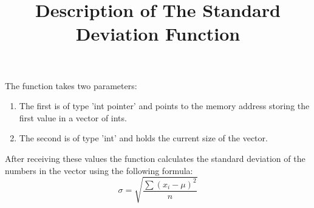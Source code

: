 \documentclass[11pt, letterpaper]{report}
\begin{document}
\title{Description of The Standard Deviation Function}
\maketitle
\noindent The function takes two parameters:
\begin{enumerate}
    \item The first is of type 'int pointer' and points to the memory address storing the first value in a vector of ints.
    \item The second is of type 'int' and holds the current size of the vector.
\end{enumerate}
After receiving these values the function calculates the standard deviation of the numbers in the vector using the following formula:\\
\begin{equation*}
    \sigma = \sqrt{\frac{\sum (x_i - \mu)^2}{n}}
\end{equation*}
\end{document}
